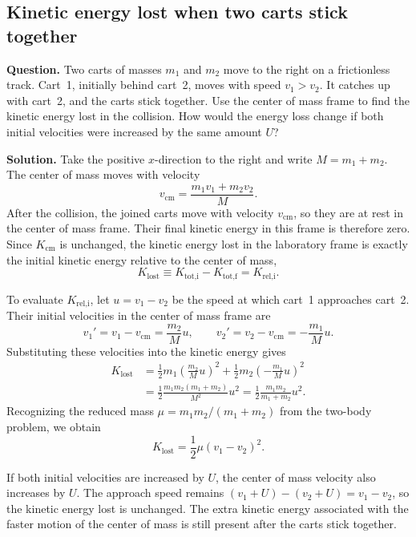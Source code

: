 \documentclass[12pt]{article}
\begin{document}
\subsection{Kinetic energy lost when two carts stick together}

\textbf{Question.}
Two carts of masses $m_1$ and $m_2$ move to the right on a frictionless track. Cart~1, initially behind cart~2, moves with speed $v_1>v_2$. It catches up with cart~2, and the carts stick together. Use the center of mass frame to find the kinetic energy lost in the collision. How would the energy loss change if both initial velocities were increased by the same amount $U$?

\textbf{Solution.}
Take the positive $x$-direction to the right and write $M=m_1+m_2$. The center of mass moves with velocity
\[
    v_{\text{cm}}=\frac{m_1v_1+m_2v_2}{M}.
\]
After the collision, the joined carts move with velocity $v_{\text{cm}}$, so they are at rest in the center of mass frame. Their final kinetic energy in this frame is therefore zero. Since $K_{\text{cm}}$ is unchanged, the kinetic energy lost in the laboratory frame is exactly the initial kinetic energy relative to the center of mass,
\[
    K_{\text{lost}}
    \equiv K_{\text{tot,i}}-K_{\text{tot,f}}
    = K_{\text{rel,i}}.
\]

To evaluate $K_{\text{rel,i}}$, let $u=v_1-v_2$ be the speed at which cart~1 approaches cart~2. Their initial velocities in the center of mass frame are
\[
    v_1' = v_1-v_{\text{cm}} = \frac{m_2}{M}u,
    \qquad
    v_2' = v_2-v_{\text{cm}} = -\frac{m_1}{M}u.
\]
Substituting these velocities into the kinetic energy gives
\begin{align*}
    K_{\text{lost}}
    &= \frac{1}{2}m_1\left(\frac{m_2}{M}u\right)^2
     + \frac{1}{2}m_2\left(-\frac{m_1}{M}u\right)^2 \\
    &= \frac{1}{2}\frac{m_1m_2(m_1+m_2)}{M^2}u^2
     = \frac{1}{2}\frac{m_1m_2}{m_1+m_2}u^2.
\end{align*}
Recognizing the reduced mass $\mu=m_1m_2/(m_1+m_2)$ from the two-body problem, we obtain
\[
    \boxed{K_{\text{lost}}=\frac{1}{2}\mu(v_1-v_2)^2}.
\]

If both initial velocities are increased by $U$, the center of mass velocity also increases by $U$. The approach speed remains $(v_1+U)-(v_2+U)=v_1-v_2$, so the kinetic energy lost is unchanged. The extra kinetic energy associated with the faster motion of the center of mass is still present after the carts stick together.
\end{document}
